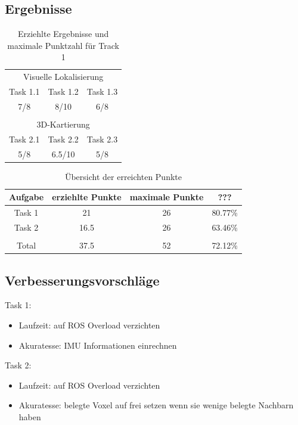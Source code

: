 \documentclass[12pt,titlepage, a4paper]{article}
\begin{document}
\subsection{Ergebnisse}
\FloatBarrier
\begin{table}[h!]
\centering
\begin{tabular}{c|c|c}
\multicolumn{3}{c}{Visuelle Lokalisierung}\vspace{2mm}\\
Task 1.1 & Task 1.2 & Task 1.3\\
\hline\vspace{2mm}
7/8 & 8/10 & 6/8\\
\multicolumn{3}{c}{ }\\
\multicolumn{3}{c}{3D-Kartierung}\vspace{2mm}\\
Task 2.1 & Task 2.2 & Task 2.3\\
\hline\vspace{2mm}
5/8 & 6.5/10 & 5/8\\
\end{tabular}
\caption{Erziehlte Ergebnisse und maximale Punktzahl für Track 1}
\label{table:finalscore1}
\end{table}

\begin{table}[h!]
\centering
\begin{tabular}{c|c|c|c}
Aufgabe & erziehlte Punkte & maximale Punkte & ???\\
\hline
Task 1 & 21 & 26 & 80.77\% \\
Task 2 & 16.5 & 26 & 63.46\% \\
\hline
\hline
 & & \\
Total & 37.5 & 52 & 72.12\%\\
\end{tabular}
\caption{Übersicht der erreichten Punkte}
\label{table:finalscore2}
\end{table}

\FloatBarrier

\subsection{Verbesserungsvorschläge}

Task 1:
\begin{itemize}
	\item{Laufzeit: auf ROS Overload verzichten}
	\item{Akuratesse: IMU Informationen einrechnen}
\end{itemize}

Task 2:
\begin{itemize}
	\item{Laufzeit: auf ROS Overload verzichten}
	\item{Akuratesse: belegte Voxel auf frei setzen wenn sie wenige belegte Nachbarn haben}
\end{itemize}




\end{document}
